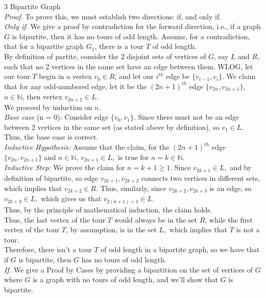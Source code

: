 \documentclass{article}
\begin{document}
{\Large 3 Bipartite Graph} \\[.5cm]
\textit{Proof.} To prove this, we must establish two directions: if, and only if.\\[.5cm]
\textit{Only if.} We give a proof by contradiction for the forward direction, i.e., if a graph $G$ is bipartite, then it has no tours of odd length. Assume, for a contradiction, that for a bipartite graph $G_1$, there is a tour $T$ of odd length. \\[.3cm]
\indent By definition of partite, consider the 2 disjoint sets of vertices of $G$, say $L$ and $R$, such that no 2 vertices in the same set have an edge between them. WLOG, let our tour $T$ begin in a vertex $v_0\in R$, and let our $i^{th}$ edge be $\{v_{i-1}, v_i\}$. We claim that for any odd-numbered edge, let it be the $(2n+1)^{th}$ edge $\{v_{2n}, v_{2n+1}\}$, $n\in\mathbb{N}$, then vertex $v_{2n+1}\in L.$ \\[.3cm]
\indent We proceed by induction on $n.$\\[.2cm]
\indent \textit{Base case} (n = 0): Consider edge $\{v_0, v_1\}.$ Since there must not be an edge between 2 vertices in the same set (as stated above by definition), so $v_1\in L.$\\[.2cm]
\indent Thus, the base case is correct.\\[.2cm]
\indent \textit{Inductive Hypothesis:} Assume that the claim, for the $(2n+1)^{th}$ edge $\{v_{2n}, v_{2n+1}\}$ and $n\in\mathbb{N}$, $v_{2n+1}\in L,$ is true for $n = k\in\mathbb{N}.$\\[.2cm]
\indent \textit{Inductive Step:} We prove the claim for $n = k + 1\geq1$. Since $v_{2k+1}\in L,$ and by definition of bipartite, so edge $v_{2k+1}, v_{2k+2}$ connects two vertices in different sets, which implies that $v_{2k+2}\in R.$ Thus, similarly, since $v_{2k+2}, v_{2k+3}$ is an edge, so $v_{2k+3}\in L,$ which gives us that $v_{2(k+1)+1}\in L.$\\[.2cm]
\indent Thus, by the principle of mathematical induction, the claim holds.\\[.3cm]
\indent Thus, the last vertex of the tour $T$ would always be in the set $R$, while the first vertex of the tour $T$, by assumption, is in the set $L,$ which implies that $T$ is not a tour.\\[.2cm]
\indent Therefore, there isn't a tour $T$ of odd length in a bipartite graph, so we have that if $G$ is bipartite, then $G$ has no tours of odd length. \\[.5cm]
\textit{If.} We give a Proof by Cases by providing a bipartition on the set of vertices of $G$ where $G$ is a graph with no tours of odd length, and we'll show that $G$ is bipartite. \\[.3cm]
\end{document}
